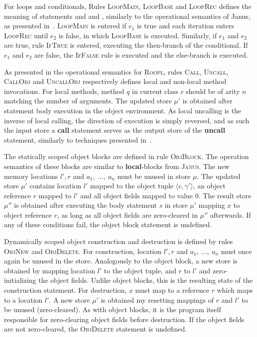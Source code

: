 For loops and conditionals, Rules \textsc{LoopMain}, \textsc{LoopBase} and \textsc{LoopRec} defines the meaning of  statements and  and , similarly to the operational semantics of Janus, as presented in~\cite{ty:ejanus}. \textsc{LoopMain} is entered if $e_1$ is true and each iteration enters \textsc{LoopRec} until $e_2$ is false, in which \textsc{LoopBase} is executed. Similarly, if $e_1$ and $e_2$ are true, rule \textsc{IfTrue} is entered, executing the then-branch of the conditional. If $e_1$ and $e_2$ are false, the \textsc{IfFalse} rule is executed and the else-branch is executed.

As presented in the operational semantics for \textsc{Roopl}, rules \textsc{Call}, \textsc{Uncall}, \textsc{CallObj} and \textsc{UncallObj} respectively defines local and non-local method invocations. For local methods, method $q$ in current class $c$ should be of arity $n$ matching the number of arguments. The updated store $\mu'$ is obtained after statement body execution in the object environment. As local uncalling is the inverse of local calling, the direction of execution is simply reversed, and as such the input store a \textbf{call} statement serves as the output store of the \textbf{uncall} statement, similarly to techniques presented in~\cite{ty:janus, ty:ejanus}.

The statically scoped object blocks are defined in rule \textsc{ObjBlock}. The operation semantics of these blocks are similar to \textbf{local}-blocks from \textsc{Janus}. The new memory locations $l', r$ and $a_1,\ ...,\ a_n$ must be unused in store $\mu$. The updated store $\mu'$ contains location $l'$ mapped to the object tuple $\langle c, \gamma' \rangle$, an object reference $r$ mapped to $l'$ and all object fields mapped to value $0$. The result store $\mu''$ is obtained after executing the body statement $s$ in store $\mu'$ mapping $x$ to object reference $r$, as long as all object fields are zero-cleared in $\mu''$ afterwards. If any of these conditions fail, the object block statement is undefined.

Dynamically scoped object construction and destruction is defined by rules \textsc{ObjNew} and \textsc{ObjDelete}. For construction, location $l', r$ and $a_1,\ ...,\ a_n$ must once again be unused in the store. Analogously to the object block, a new store is obtained by mapping location $l'$ to the object tuple, and $r$ to $l'$ and zero-initializing the object fields. Unlike object blocks, this is the resulting state of the construction statement. For destruction, $x$ must map to a reference $r$ which maps to a location $l'$. A new store $\mu'$ is obtained my resetting mappings of $r$ and $l'$ to be unused (zero-cleared). As with object blocks, it is the program itself responsible for zero-clearing object fields before destruction. If the object fields are not zero-cleared, the \textsc{ObjDelete} statement is undefined.

